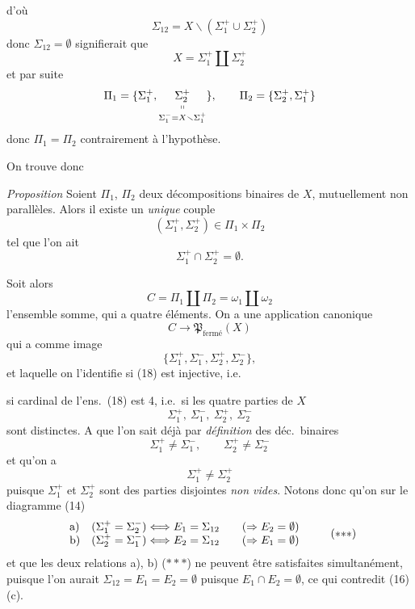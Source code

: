 \documentclass[11pt,a4paper]{article}
\begin{document}
d'où
\[
  \Sigma_{12}=X\smallsetminus(\Sigma_{1}^{+}\cup\Sigma_{2}^{+})
\]
donc $\Sigma_{12}=\emptyset$ signifierait que
\[
  X=\Sigma_{1}^{+}\amalg\Sigma_{2}^{+}
\]
et par suite
\[
  \Pi_{1}=\{\Sigma_{1}^{+},\underset{\Sigma_{1}^{-}=X\smallsetminus
  \Sigma_{1}^{+}}{\underset{\shortparallel}{\Sigma_{2}^{+}}}\},\qquad
  \Pi_{2}=\{\Sigma_{2}^{+},\Sigma_{1}^{+}\}
\]
donc \struck{\ill{}} $\Pi_{1}=\Pi_{2}$ contrairement à l'hypothèse.

On trouve donc

\emph{Proposition} Soient $\Pi_{1}$, $\Pi_{2}$ deux
décompositions binaires de $X$, mutuellement non parallèles. Alors il existe
un \emph{unique} couple
\[
  (\Sigma_{1}^{+},\Sigma_{2}^{+})\in\Pi_{1}\times\Pi_{2}
\]
tel que l'on ait
\[
  \Sigma_{1}^{+}\cap\Sigma_{2}^{+}=\emptyset .
\]

Soit alors
\[
  C=\Pi_{1}\amalg\Pi_{2}=\omega_{1}\amalg\omega_{2}
  \tag{17}
\]
l'ensemble somme, qui a quatre éléments. On a une application canonique
\[
  C\longrightarrow\mathfrak{P}_{\text{fermé}}(X)
  \tag{18}
\]
qui a comme image
\[
  \{\Sigma_{1}^{+},\Sigma_{1}^{-},\Sigma_{2}^{+},\Sigma_{2}^{-}\},
  \tag{19}
\]
et laquelle on l'identifie si (18) est injective, i.e.

si \struck{\ill{}} cardinal de l'ens.\ (18) est 4, i.e.\ si les quatre
parties de $X$
\[
  \Sigma_{1}^{+},\ \Sigma_{1}^{-},\ \Sigma_{2}^{+},\ \Sigma_{2}^{-}
\]
sont distinctes. A   que l'on sait déjà
par   \emph{définition}
des déc.\ binaires
\[
  \Sigma_{1}^{+}\neq\Sigma_{1}^{-},\qquad\Sigma_{2}^{+}\neq\Sigma_{2}^{-}
  \tag{$*$}
\]
et qu'on a
\[
  \Sigma_{1}^{+}\neq\Sigma_{2}^{+}
  \tag{$**$}
\]
puisque $\Sigma_{1}^{+}$ et $\Sigma_{2}^{+}$ sont des parties disjointes
\emph{non vides}. Notons donc qu'on  sur le diagramme (14)
\[
  \left.
  \begin{array}{ll}
    \text{a)} & (\Sigma_{1}^{+}=\Sigma_{2}^{-})\Longleftrightarrow
    E_{1}=\Sigma_{12}\qquad(\Rightarrow E_{2}=\emptyset)\\
    \text{b)} & (\Sigma_{2}^{+}=\Sigma_{1}^{-})\Longleftrightarrow
    E_{2}=\Sigma_{12}\qquad(\Rightarrow E_{1}=\emptyset)
  \end{array}
  \right.
  \tag{$*{*}*$}
\]
et que les deux relations a), b)  
($*{*}*$) ne peuvent être satisfaites simultanément, puisque
 l'on aurait $\Sigma_{12}=E_{1}=E_{2}=\emptyset$
puisque $E_{1}\cap E_{2}=\emptyset$, ce qui contredit (16) (c).
\end{document}
